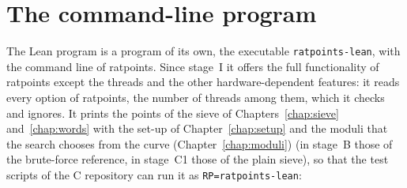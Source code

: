 \section{The command-line program}\label{sec:cli}

The Lean program is a program of its own, the executable \verb|ratpoints-lean|, with the command
line of ratpoints. Since stage~I it offers the full functionality of ratpoints except the threads
and the other hardware-dependent features: it reads every option of ratpoints, the number of threads
among them, which it checks and ignores. It prints the points of the sieve of
Chapters~\ref{chap:sieve} and~\ref{chap:words} with the set-up of Chapter~\ref{chap:setup} and the
moduli that the search chooses from the curve (Chapter~\ref{chap:moduli}) (in stage~B those of the
brute-force reference, in stage~C1 those of the plain sieve), so that the test scripts of the C
repository can run it as \verb|RP=ratpoints-lean|:

